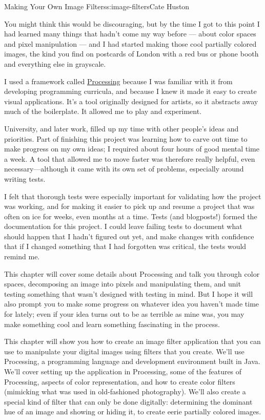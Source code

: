 \begin{aosachapter}{Making Your Own Image Filters}{s:image-filters}{Cate Huston}

You might think this would be discouraging, but by the time I got to
this point I had learned many things that hadn't come my way before ---
about color spaces and pixel manipulation --- and I had started making
those cool partially colored images, the kind you find on postcards of
London with a red bus or phone booth and everything else in grayscale.

I used a framework called \href{https://processing.org/}{Processing}
because I was familiar with it from developing programming curricula,
and because I knew it made it easy to create visual applications. It's a
tool originally designed for artists, so it abstracts away much of the
boilerplate. It allowed me to play and experiment.

University, and later work, filled up my time with other people's ideas
and priorities. Part of finishing this project was learning how to carve
out time to make progress on my own ideas; I required about four hours
of good mental time a week. A tool that allowed me to move faster was
therefore really helpful, even necessary---although it came with its own
set of problems, especially around writing tests.

I felt that thorough tests were especially important for validating how
the project was working, and for making it easier to pick up and resume
a project that was often on ice for weeks, even months at a time. Tests
(and blogposts!) formed the documentation for this project. I could
leave failing tests to document what should happen that I hadn't figured
out yet, and make changes with confidence that if I changed something
that I had forgotten was critical, the tests would remind me.

This chapter will cover some details about Processing and talk you
through color spaces, decomposing an image into pixels and manipulating
them, and unit testing something that wasn't designed with testing in
mind. But I hope it will also prompt you to make some progress on
whatever idea you haven't made time for lately; even if your idea turns
out to be as terrible as mine was, you may make something cool and learn
something fascinating in the process.

\label{the-app}

This chapter will show you how to create an image filter application
that you can use to manipulate your digital images using filters that
you create. We'll use Processing, a programming language and development
environment built in Java. We'll cover setting up the application in
Processing, some of the features of Processing, aspects of color
representation, and how to create color filters (mimicking what was used
in old-fashioned photography). We'll also create a special kind of
filter that can only be done digitally: determining the dominant hue of
an image and showing or hiding it, to create eerie partially colored
images.


\end{aosachapter}
